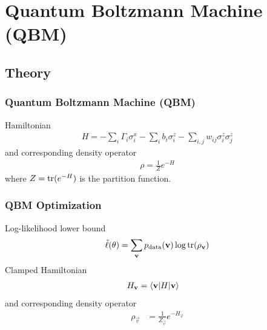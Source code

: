 \documentclass{beamer}
\begin{document}

\section{Quantum Boltzmann Machine (QBM)}

\subsection{Theory}
\begin{frame}
    \frametitle{Quantum Boltzmann Machine (QBM)}
    Hamiltonian~\cite{amin_2018}
    \begin{align}
        H = -\sum_i \Gamma_i \sigma_i^x -\sum_i b_i \sigma_i^z - \sum_{i,j} w_{ij} \sigma_i^z \sigma_j^z
    \end{align}
    and corresponding density operator
    \begin{align}
        \rho = \frac{1}{Z} e^{-H}
    \end{align}
    where \( Z = \text{tr}(e^{-H}) \) is the partition function.
\end{frame}

\begin{frame}
    \frametitle{QBM Optimization}
    Log-likelihood lower bound
    \begin{align}
        \tilde{\ell}(\theta) = \sum_{\mathbf{v}} p_{\text{data}}(\mathbf{v}) \log \text{tr}(\rho_{\mathbf{v}})
    \end{align}
    Clamped Hamiltonian
    \begin{align}
        H_{\mathbf{v}}
            &= \braket{\mathbf{v}|H|\mathbf{v}}
    \end{align}
    and corresponding density operator
    \begin{align}
        \rho_\vec{v}
            &= \frac{1}{Z_\vec{v}} e^{-H_\vec{v}}
    \end{align}
\end{frame}
\end{document}
